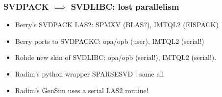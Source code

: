 \begin{frame}[plain]
	\frametitle{SVDPACK $\implies$ SVDLIBC: lost parallelism}
	\begin{block}{}
    \begin{itemize}
      \item Berry's SVDPACK LAS2: SPMXV (BLAS?), IMTQL2 (EISPACK)
      \item Berry ports to SVDPACKC: opa/opb (user), IMTQL2 (serial!)
      \item Rohde new skin of SVDLIBC: opa/opb (serial!),
        IMTQL2 (serial!).
      \item Radim's python wrapper SPARSESVD : same all
      \item Radim's GenSim uses a serial LAS2 routine!
    \end{itemize}
	\end{block}
\end{frame}
